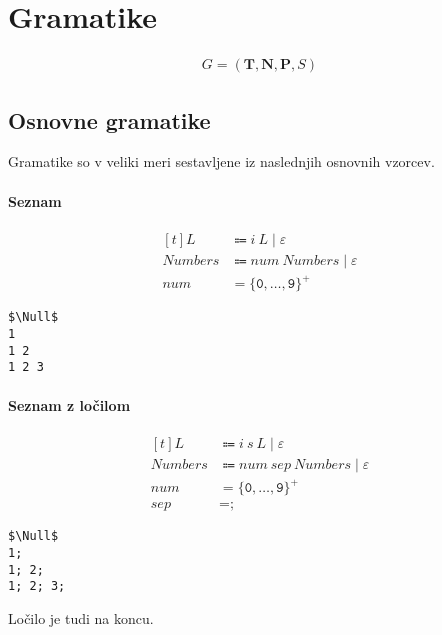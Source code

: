 \documentclass{report}
\newcommand{\Null}{\varepsilon}
\newcommand{\Char}[1]{\texttt{#1}}
\newcommand{\Spc}{\ }
\newcommand{\Union}{\mathrel{|}}
\newcommand{\KleenePlus}[1]{#1^+}
\newcommand{\Set}[1]{\mathbf{#1}}
\newcommand{\Terminals}{\Set{T}}
\newcommand{\Productions}{\Set{P}}
\newcommand{\NonTerminals}{\Set{N}}
\newcommand{\Arrow}{\Coloneq}
\newcommand{\NT}[1]{{#1}}
\newcommand{\T}[1]{{#1}}
\begin{document}
\chapter{Gramatike}

\begin{tcolorbox}[title={Definicija}]
  \begin{equation*}
    \begin{aligned}
      G = (\Terminals, \NonTerminals, \Productions, \NT{S})
    \end{aligned}
  \end{equation*}
\end{tcolorbox}

\section{Osnovne gramatike} 
Gramatike so v veliki meri sestavljene iz naslednjih osnovnih vzorcev.

\subsubsection{Seznam}
\begin{equation*}
  \begin{aligned}[t]
    \NT{L} &\Arrow \T{i} \Spc \NT{L} \Union \Null\\[1em]
    \NT{Numbers} &\Arrow \T{num} \Spc \NT{Numbers} \Union \Null\\[1em]
    \T{num} &= \KleenePlus{\{\Char{0}, \dots, \Char{9}\}}
  \end{aligned}
\end{equation*}
\begin{lstlisting}
$\Null$
1
1 2
1 2 3
\end{lstlisting}

\subsubsection{Seznam z ločilom}
\begin{equation*}
  \begin{aligned}[t]
    \NT{L} &\Arrow \T{i} \Spc \T{s} \Spc \NT{L} \Union \Null\\[1em]
    \NT{Numbers} &\Arrow \T{num} \Spc \T{sep} \Spc \NT{Numbers} \Union \Null\\[1em]
    \T{num} &= \KleenePlus{\{\Char{0}, \dots, \Char{9}\}}\\
    \T{sep} &= \Char{;}
  \end{aligned}
\end{equation*}
\begin{lstlisting}
$\Null$
1;
1; 2;
1; 2; 3;
\end{lstlisting}
Ločilo je tudi na koncu.
\end{document}
